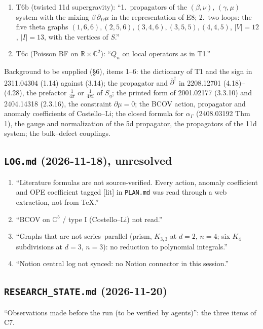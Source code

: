 \documentclass[10pt,a4paper]{article}
\numberwithin{equation}{section}
\begin{document}
\begin{enumerate}
\item T6b (twisted 11d supergravity): ``1.\ propagators of the $(\beta,\nu)$, $(\gamma,\mu)$ system with the mixing $\beta\,\partial_\Omega\mu$ in the representation of E8; 2.\ two loops: the five theta graphs $(1,6,6),(2,5,6),(3,4,6),(3,5,5),(4,4,5)$, $|V|=12$, $|I|=13$, with the vertices of $S$.''
\item T6c (Poisson BF on $\mathbb R\times\mathbb C^2$): ``$Q_n$ on local operators as in T1.''
\end{enumerate}
Background to be supplied (\S6), items 1--6: the dictionary of T1 and the sign in 2311.04304 (1.14) against (3.14); the propagator and $\bar\partial^\dagger$ in 2208.12701 (4.18)--(4.28), the prefactor $\frac1{4\pi}$ or $\frac1{4\pi i}$ of $S_\eta$; the printed form of 2001.02177 (3.3.10) and 2404.14318 (2.3.16), the constraint $\partial\mu=0$; the BCOV action, propagator and anomaly coefficients of Costello--Li; the closed formula for $\alpha_\Gamma$ (2408.03192 Thm 1), the gauge and normalization of the 5d propagator, the propagators of the 11d system; the bulk--defect couplings.

\subsection{\texttt{LOG.md} (2026-11-18), unresolved}
\begin{enumerate}\itemsep1pt
\item ``Literature formulas are not source-verified. Every action, anomaly coefficient and OPE coefficient tagged [lit] in \texttt{PLAN.md} was read through a web extraction, not from TeX.''
\item ``BCOV on $\mathbb C^5$ / type I (Costello--Li) not read.''
\item ``Graphs that are not series--parallel (prism, $K_{3,3}$ at $d=2$, $n=4$; six $K_4$ subdivisions at $d=3$, $n=3$): no reduction to polynomial integrals.''
\item ``Notion central log not synced: no Notion connector in this session.''
\end{enumerate}

\subsection{\texttt{RESEARCH\_STATE.md} (2026-11-20)}
``Observations made before the run (to be verified by agents)'': the three items of C7.
\end{document}
